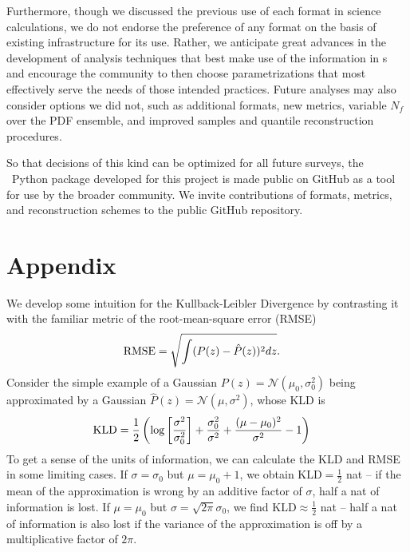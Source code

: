Furthermore, though we discussed the previous use of each format in science 
calculations, we do not endorse the preference of any format on the basis of 
existing infrastructure for its use.
Rather, we anticipate great advances in the development of analysis techniques 
that best make use of the information in \pz s and encourage the community to 
then choose parametrizations that most effectively serve the needs of those 
intended practices.
Future analyses may also consider options we did not, such as additional 
formats, new metrics, variable $N_{f}$ over the PDF ensemble, and improved 
samples and quantile reconstruction procedures.

So that decisions of this kind can be optimized for all future surveys, the 
\qp\ Python package developed for this project is made public on GitHub as a 
tool for use by the broader community.
We invite contributions of formats, metrics, and reconstruction schemes to the 
public GitHub repository.


\section*{Appendix}
\label{sec:kld}
\renewcommand{\thesubsection}{\Alph{section}}

We develop some intuition for the Kullback-Leibler Divergence by contrasting it 
with the familiar metric of the root-mean-square error (RMSE)
\begin{align}
\eqlabel{eq:rmse}
\mathrm{RMSE} &= \sqrt{\int (P(z) - \hat{P}(z))^{2} dz}.
\end{align}
Consider the simple example of a Gaussian $P(z) = \mathcal{N}(\mu_{0}, 
\sigma_{0}^{2})$ being approximated by a Gaussian $\hat{P}(z) = 
\mathcal{N}(\mu, \sigma^{2})$, whose KLD is
\begin{align}
\eqlabel{eq:gaussian}
\mathrm{KLD} &= 
\frac{1}{2}\left(\log\left[\frac{\sigma^{2}}{\sigma_{0}^{2}}\right] + 
\frac{\sigma_{0}^{2}}{\sigma^{2}} + \frac{(\mu-\mu_{0})^{2}}{\sigma^{2}} - 
1\right)
\end{align}
To get a sense of the units of information, we can calculate the KLD and RMSE 
in some limiting cases.
If $\sigma=\sigma_{0}$ but $\mu=\mu_{0}+1$, we obtain 
$\mathrm{KLD}=\frac{1}{2}$ nat -- if the mean of the approximation is wrong by 
an additive factor of $\sigma$, half a nat of information is lost.
If $\mu=\mu_{0}$ but $\sigma=\sqrt{2\pi}\sigma_{0}$, we find 
$\mathrm{KLD}\approx\frac{1}{2}$ nat -- half a nat of information is also lost 
if the variance of the approximation is off by a multiplicative factor of 
$2\pi$.

